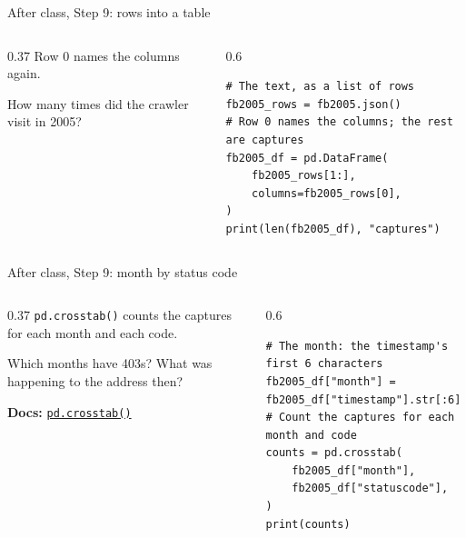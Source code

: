 \documentclass[9pt,aspectratio=169]{beamer}
\begin{document}
\begin{frame}[fragile]{After class, Step 9: rows into a table}
    \begin{columns}[T]
        \begin{column}{0.37\textwidth}
            Row 0 names the columns again.

            \medskip
            How many times did the crawler visit in 2005?
        \end{column}
        \begin{column}{0.6\textwidth}
\begin{lstlisting}
# The text, as a list of rows
fb2005_rows = fb2005.json()
# Row 0 names the columns; the rest are captures
fb2005_df = pd.DataFrame(
    fb2005_rows[1:],
    columns=fb2005_rows[0],
)
print(len(fb2005_df), "captures")
\end{lstlisting}
        \end{column}
    \end{columns}
\end{frame}

\begin{frame}[fragile]{After class, Step 9: month by status code}
    \begin{columns}[T]
        \begin{column}{0.37\textwidth}
            \texttt{pd.crosstab()} counts the captures for each month and each code.

            \medskip
            Which months have 403s? What was happening to the address then?

            \medskip
            {\scriptsize\textbf{Docs:} \href{https://pandas.pydata.org/docs/reference/api/pandas.crosstab.html}{\texttt{pd.crosstab()}}\par}
        \end{column}
        \begin{column}{0.6\textwidth}
\begin{lstlisting}
# The month: the timestamp's first 6 characters
fb2005_df["month"] = fb2005_df["timestamp"].str[:6]
# Count the captures for each month and code
counts = pd.crosstab(
    fb2005_df["month"],
    fb2005_df["statuscode"],
)
print(counts)
\end{lstlisting}
        \end{column}
    \end{columns}
\end{frame}
\end{document}
